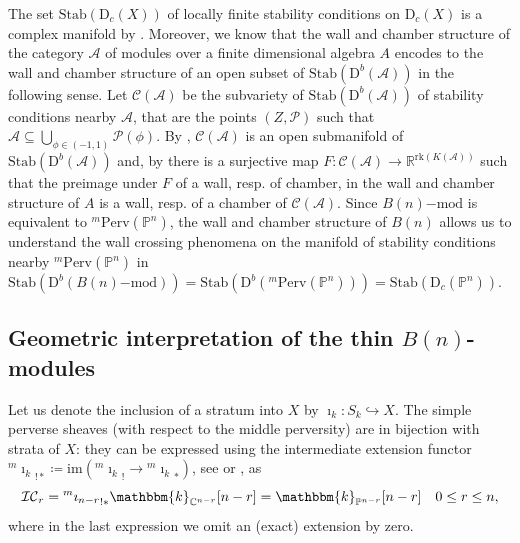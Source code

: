 \documentclass[11pt]{amsart}
\theoremstyle{definition}
\newcommand{\C}{\mathbb{C}}
\newcommand{\kk}{\mathbbm{k}}
\newcommand{\PP}{\mathbb{P}}
\newcommand{\im}{\mathrm{im}}
\newcommand{\cat}[1]{\mathrm{#1}}
\renewcommand{\mod}[1]{{#1}\mathrm{-mod}}
\newcommand{\perv}[2]{{}^{#1}\cat{Perv}\!\left(#2\right)}
\newcommand{\pfun}[2]{{}^{#1}{#2}}
\newcommand{\ic}[2]{\pfun{#1}{\sh{IC}_{#2}}}
\newcommand{\constr}[2]{\cat{D}_{#1}({#2})}
\newcommand{\der}[2]{\cat{D}^{#1}({#2})}
\newcommand{\sh}[1]{\mathcal{#1}}
\newcommand{\stab}[1]{\mathrm{Stab}(#1)}
\begin{document}
The set $\stab{\constr{c}{X}}$ of locally finite stability conditions on $\constr{c}{X}$ is a complex manifold by \cite[Theorem 1.2]{bridgeland07}. Moreover, %
we know that the wall and chamber structure of the category $\mathcal{A}$ of modules  over a finite dimensional algebra $A$  encodes to the wall and chamber structure of an open subset of $\stab{\der{b}{\mathcal{A}}}$ in the following sense. Let $\mathcal{C}(\mathcal{A})$ be the subvariety of $\stab{\der{b}{\mathcal{A}}}$ of stability conditions nearby $\mathcal{A}$, that are the points $(Z, \mathcal{P})$ such that $\mathcal{A}\subseteq \bigcup_{\phi\in(-1,1)}\mathcal{P}(\phi)$. By \cite[Lemma 7.3]{bridgelandWC},  $\mathcal{C}(\mathcal{A})$ is an open submanifold of $\stab{\der{b}{\mathcal{A}}}$ and, by \cite[Proposition 7.4]{bridgelandWC} there is a surjective map $F: \mathcal{C}(\mathcal{A})\rightarrow \mathbb{R}^{\textrm{rk}(K(\mathcal{A}))}$ such that the preimage under $F$ of a wall, resp. of  chamber, in the wall and chamber structure of $A$ is a wall, resp. of a chamber of $\mathcal{C}(\mathcal{A})$.  Since $\mod {B(n)}$ is equivalent to $\perv{m}{\PP^n}$, the wall and chamber structure of $B(n)$ allows us to understand the wall crossing phenomena on the manifold of  stability conditions nearby $\perv{m}{\PP^n}$ in 
 $\stab{{ \der{b}{\mod {B(n)}}}}= \stab{\der{b}{\perv{m}{\PP^n}}}=\stab{\constr{c}{\PP^n}}$.

\subsection{Geometric interpretation of the thin $B(n)$-modules}

Let us denote the inclusion of a stratum into $X$ by $\imath_{k}\colon S_k\hookrightarrow X$. The simple perverse sheaves (with respect to the middle perversity) are in bijection with strata of $X$: they can be expressed using the intermediate extension functor ${^m\imath_k}_{!*}\coloneqq \im({^m\imath_k}_!\to{^m\imath_k}_*)$, see \cite[1.4.22]{BBD} or \cite[\S3.3]{Achar}, as
\[
\ic{}{r}={^m\imath_{n-r}}_{!*}\kk_{\C^{n-r}}[n-r]=\kk_{\PP^{n-r}}[n-r] \quad 0\leq r \leq n,
\]
where in the last expression we omit an (exact) extension by zero. 

\end{document}
